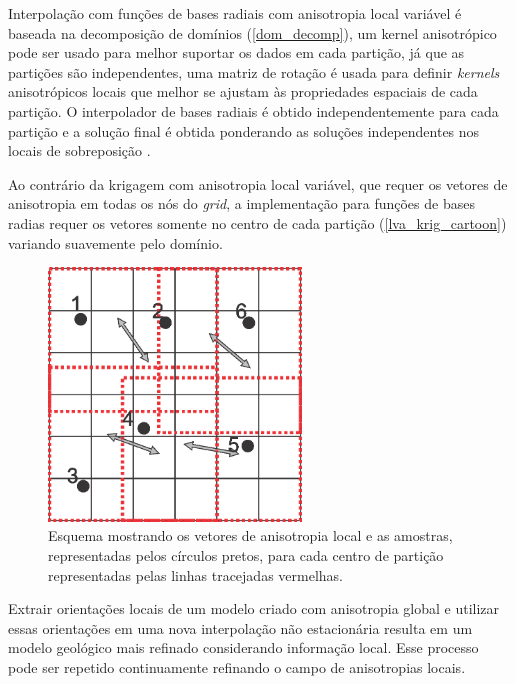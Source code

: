 
Interpolação com funções de bases radiais com anisotropia local variável é baseada na decomposição de domínios (\autoref{dom_decomp}), um kernel anisotrópico pode ser usado para melhor suportar os dados em cada partição, já que as partições são independentes, uma matriz de rotação é usada para definir \textit{kernels} anisotrópicos locais que melhor se ajustam às propriedades espaciais de cada partição. O interpolador de bases radiais é obtido independentemente para cada partição e a solução final é obtida ponderando as soluções independentes nos locais de sobreposição \cite{martin2017implicitmodeling}.

Ao contrário da krigagem com anisotropia local variável, que requer os vetores de anisotropia em todas os nós do \textit{grid}, a implementação para funções de bases radias requer os vetores somente no centro de cada partição (\autoref{lva_krig_cartoon}) variando suavemente pelo domínio.

\begin{figure}[H]
\caption{\label{lva_rbf+cartoon} Esquema mostrando os vetores de anisotropia local e as amostras, representadas pelos círculos pretos, para cada centro de partição representadas pelas linhas tracejadas vermelhas.}
	\centering
		\includegraphics[width=0.6\textwidth]{capitulo_2/imagens/lvarbf.jpg}
\end{figure}

Extrair orientações locais de um modelo criado com anisotropia global e utilizar essas orientações em uma nova interpolação não estacionária resulta em um modelo geológico mais refinado considerando informação local. Esse processo pode ser repetido continuamente refinando o campo de anisotropias locais. 

